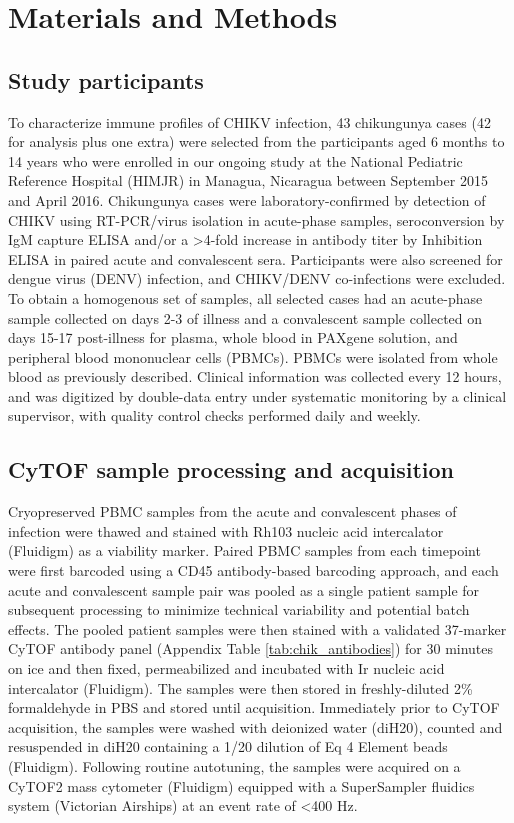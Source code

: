 \section{Materials and Methods}

\subsection{Study participants}

To characterize immune profiles of CHIKV infection, 43 chikungunya cases (42 for analysis plus one extra) were selected from the participants aged 6 months to 14 years who were enrolled in our ongoing study at the National Pediatric Reference Hospital (HIMJR) in Managua, Nicaragua between September 2015 and April 2016. Chikungunya cases were laboratory-confirmed by detection of CHIKV using RT-PCR/virus isolation in acute-phase samples, seroconversion by IgM capture ELISA and/or a >4-fold increase in antibody titer by Inhibition ELISA in paired acute and convalescent sera.\autocite{Balmaseda2006,Hammond2005} Participants were also screened for dengue virus (DENV) infection, and CHIKV/DENV co-infections were excluded. To obtain a homogenous set of samples, all selected cases had an acute-phase sample collected on days 2-3 of illness and a convalescent sample collected on days 15-17 post-illness for plasma, whole blood in PAXgene solution, and peripheral blood mononuclear cells (PBMCs). PBMCs were isolated from whole blood as previously described.\autocite{Zompi2012} Clinical information was collected every 12 hours, and was digitized by double-data entry under systematic monitoring by a clinical supervisor, with quality control checks performed daily and weekly. 

\subsection{CyTOF sample processing and acquisition}

Cryopreserved PBMC samples from the acute and convalescent phases of infection were thawed and stained with Rh103 nucleic acid intercalator (Fluidigm) as a viability marker. Paired PBMC samples from each timepoint were first barcoded using a CD45 antibody-based barcoding approach,\autocite{Mei2016} and each acute and convalescent sample pair was pooled as a single patient sample for subsequent processing to minimize technical variability and potential batch effects. The pooled patient samples were then stained with a validated 37-marker CyTOF antibody panel (Appendix Table \ref{tab:chik_antibodies}) for 30 minutes on ice and then fixed, permeabilized and incubated with Ir nucleic acid intercalator (Fluidigm). The samples were then stored in freshly-diluted 2\% formaldehyde in PBS and stored until acquisition. Immediately prior to CyTOF acquisition, the samples were washed with deionized water (diH20), counted and resuspended in diH20 containing a 1/20 dilution of Eq 4 Element beads (Fluidigm). Following routine autotuning, the samples were acquired on a CyTOF2 mass cytometer (Fluidigm) equipped with a SuperSampler fluidics system (Victorian Airships) at an event rate of <400 Hz. 

